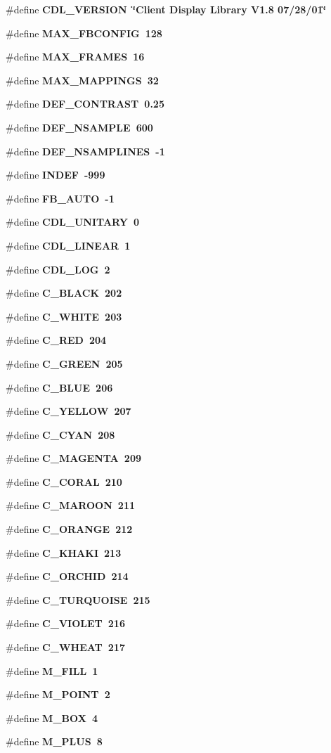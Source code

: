 \begin{CompactItemize}
\item 
\#define \bf{CDL\_\-VERSION}~\char`\"{}Client Display Library V1.8 07/28/01\char`\"{}
\item 
\#define \bf{MAX\_\-FBCONFIG}~128
\item 
\#define \bf{MAX\_\-FRAMES}~16
\item 
\#define \bf{MAX\_\-MAPPINGS}~32
\item 
\#define \bf{DEF\_\-CONTRAST}~0.25
\item 
\#define \bf{DEF\_\-NSAMPLE}~600
\item 
\#define \bf{DEF\_\-NSAMPLINES}~-1
\item 
\#define \bf{INDEF}~-999
\item 
\#define \bf{FB\_\-AUTO}~-1
\item 
\#define \bf{CDL\_\-UNITARY}~0
\item 
\#define \bf{CDL\_\-LINEAR}~1
\item 
\#define \bf{CDL\_\-LOG}~2
\item 
\#define \bf{C\_\-BLACK}~202
\item 
\#define \bf{C\_\-WHITE}~203
\item 
\#define \bf{C\_\-RED}~204
\item 
\#define \bf{C\_\-GREEN}~205
\item 
\#define \bf{C\_\-BLUE}~206
\item 
\#define \bf{C\_\-YELLOW}~207
\item 
\#define \bf{C\_\-CYAN}~208
\item 
\#define \bf{C\_\-MAGENTA}~209
\item 
\#define \bf{C\_\-CORAL}~210
\item 
\#define \bf{C\_\-MAROON}~211
\item 
\#define \bf{C\_\-ORANGE}~212
\item 
\#define \bf{C\_\-KHAKI}~213
\item 
\#define \bf{C\_\-ORCHID}~214
\item 
\#define \bf{C\_\-TURQUOISE}~215
\item 
\#define \bf{C\_\-VIOLET}~216
\item 
\#define \bf{C\_\-WHEAT}~217
\item 
\#define \bf{M\_\-FILL}~1
\item 
\#define \bf{M\_\-POINT}~2
\item 
\#define \bf{M\_\-BOX}~4
\item 
\#define \bf{M\_\-PLUS}~8
\item 

\end{CompactItemize}
